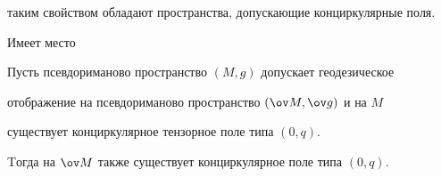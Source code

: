 таким свойством обладают пространства, допускающие конциркулярные поля.


Имеет место





\begin{lem}


Пусть псевдориманово пространство $(M,g)$ допускает геодезическое 


отображение на псевдориманово пространство $(\ov M, \ov g)$ и на $M$ 


существует конциркулярное тензорное поле типа $(0, q)$.


Tогда на $\ov M$ также существует конциркулярное поле типа $(0, q)$.


\end{lem}






